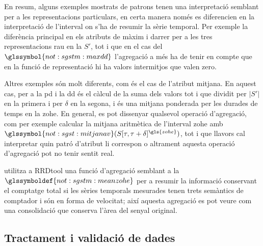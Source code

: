 En resum, alguns exemples mostrats de patrons tenen
una interpretació semblant per a les representacions particulars, en
certa manera només es diferencien en la interpretació de l'interval on
s'ha de resumir la sèrie temporal. Per exemple la diferència principal
en els atributs de màxim i darrer per a les tres representacions rau
en la $S'$, tot i que en el cas del $\glssymbol{not:sgstm:maxdd}$
l'agregació a més ha de tenir en compte que en la funció de
representació hi ha valors intermitjos que valen zero.

Altres exemples són molt diferents, com és el cas de
l'atribut mitjana. En aquest cas, per a la \gls{pd} i la \gls{dd} és
el càlcul de la suma dels valors tot i que dividit per $|S'|$ en la
primera i per $\delta$ en la segona, i és una mitjana ponderada per
les durades de temps en la \gls{zohe}.  En general, es pot dissenyar
qualsevol operació d'agregació, com per exemple calcular la mitjana
aritmètica de l'interval \gls{zohe} amb
$\glssymbol{not:sgst:mitjanav}(S[\tau,\tau+\delta]^{\gls{zohe}})$, tot i que
llavors cal interpretar quin patró d'atribut li correspon o altrament
aquesta operació d'agregació pot no tenir sentit real.


\textcite{rrdtool} utilitza a RRDtool una funció d'agregació semblant
a la $\glssymboldef{not:sgstm:meanzohe}$ per a resumir la informació
conservant el comptatge total si les sèries temporals mesurades tenen
trets semàntics de comptador i són en forma de velocitat; així aquesta
agregació es pot veure com una consolidació que conserva l'àrea del
senyal original. 










\subsection{Tractament i validació de dades}

